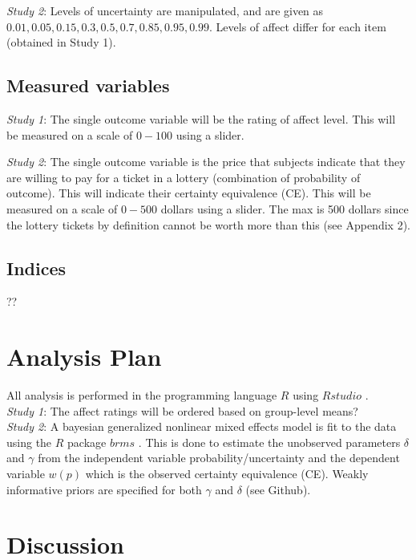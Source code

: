 \documentclass[12pt]{article}
\begin{document}
\emph{Study 2}: Levels of uncertainty are
manipulated, and are given as
$0.01, 0.05, 0.15, 0.3, 0.5, 0.7, 0.85, 0.95, 0.99$.
Levels of affect differ for each item
(obtained in Study 1).

\subsection{Measured variables}
\emph{Study 1}: The single outcome variable
will be the rating of affect level. This will
be measured on a scale of $0-100$ using a
slider.

\emph{Study 2}: The single outcome variable
is the price that subjects indicate that they
are willing to pay for a ticket in a lottery
(combination of probability of outcome).
This will indicate their certainty equivalence (CE).
This will be measured on a scale of $0-500$ dollars
using a slider. The max is 500 dollars since the
lottery tickets by definition cannot be worth
more than this (see Appendix 2).

\subsection{Indices}

??

\section{Analysis Plan}

All analysis is performed in the programming
language $R$ \autocite{rcore} using $Rstudio$
\autocite{rstudio}. \\

\emph{Study 1}: The affect ratings will be
ordered based on group-level means? \\

\emph{Study 2}: A bayesian generalized nonlinear
mixed effects model is fit to the data using the
$R$ package $brms$ \autocite{brms}.
This is done to estimate the unobserved parameters
$\delta$ and $\gamma$ from the independent variable
probability/uncertainty and the dependent variable
$w(p)$ which is the observed certainty equivalence (CE).
Weakly informative priors are specified for both
$\gamma$ and $\delta$ (see Github).


\section{Discussion}

\printbibliography
\end{document}
